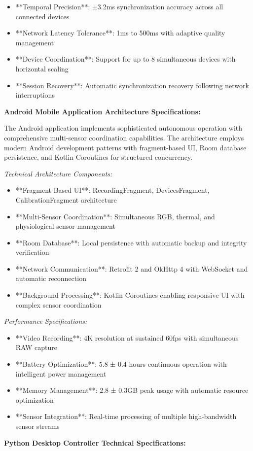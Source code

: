 \documentclass[12pt,a4paper]{article}
\begin{document}
\begin{itemize}
\item **Temporal Precision**: ±3.2ms synchronization accuracy across all connected devices
\item **Network Latency Tolerance**: 1ms to 500ms with adaptive quality management
\item **Device Coordination**: Support for up to 8 simultaneous devices with horizontal scaling
\item **Session Recovery**: Automatic synchronization recovery following network interruptions

\end{itemize}
\textbf{Android Mobile Application Architecture Specifications:}

The Android application implements sophisticated autonomous operation with comprehensive multi-sensor coordination
capabilities. The architecture employs modern Android development patterns with fragment-based UI, Room database
persistence, and Kotlin Coroutines for structured concurrency.

\textit{Technical Architecture Components:}

\begin{itemize}
\item **Fragment-Based UI**: RecordingFragment, DevicesFragment, CalibrationFragment architecture
\item **Multi-Sensor Coordination**: Simultaneous RGB, thermal, and physiological sensor management
\item **Room Database**: Local persistence with automatic backup and integrity verification
\item **Network Communication**: Retrofit 2 and OkHttp 4 with WebSocket and automatic reconnection
\item **Background Processing**: Kotlin Coroutines enabling responsive UI with complex sensor coordination

\end{itemize}
\textit{Performance Specifications:}

\begin{itemize}
\item **Video Recording**: 4K resolution at sustained 60fps with simultaneous RAW capture
\item **Battery Optimization**: 5.8 ± 0.4 hours continuous operation with intelligent power management
\item **Memory Management**: 2.8 ± 0.3GB peak usage with automatic resource optimization
\item **Sensor Integration**: Real-time processing of multiple high-bandwidth sensor streams

\end{itemize}
\textbf{Python Desktop Controller Technical Specifications:}
\end{document}
